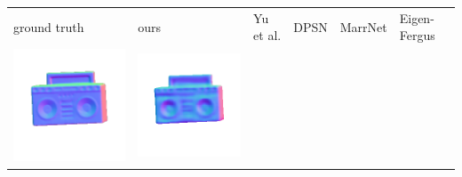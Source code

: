 \begin{tabularx}{\linewidth}{@{}Y@{}Y@{}Y@{}Y@{}Y@{}Y@{}}
ground truth & ours & Yu et al. & DPSN & MarrNet & Eigen-Fergus \\
\includegraphics[width=\linewidth]{semisynthetic/20150514_19_gt.png} &
\includegraphics[width=\linewidth]{semisynthetic/20150514_19_ours_out.png} &

\end{tabularx}
